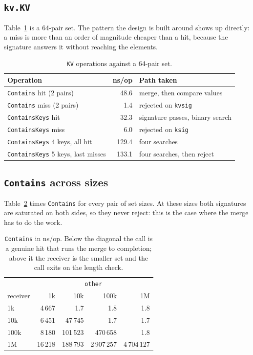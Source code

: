 \documentclass[11pt]{article}
\newcommand{\code}[1]{\texttt{#1}}
\begin{document}
\subsection{\code{kv.KV}}

Table~\ref{tab:kv} is a 64-pair set. The pattern the design is built around
shows up directly: a miss is more than an order of magnitude cheaper than a hit,
because the signature answers it without reaching the elements.

\begin{table}[h]
\centering
\begin{tabular}{lrl}
\hline
Operation & ns/op & Path taken \\
\hline
\code{Contains} hit (2 pairs)      &  48.6 & merge, then compare values \\
\code{Contains} miss (2 pairs)     &   1.4 & rejected on \code{kvsig} \\
\code{ContainsKeys} hit            &  32.3 & signature passes, binary search \\
\code{ContainsKeys} miss           &   6.0 & rejected on \code{ksig} \\
\code{ContainsKeys} 4 keys, all hit & 129.4 & four searches \\
\code{ContainsKeys} 5 keys, last misses & 133.1 & four searches, then reject \\
\hline
\end{tabular}
\caption{\code{KV} operations against a 64-pair set.}
\label{tab:kv}
\end{table}

\subsection{\code{Contains} across sizes}

Table~\ref{tab:pairwise} times \code{Contains} for every pair of set sizes. At
these sizes both signatures are saturated on both sides, so they never reject:
this is the case where the merge has to do the work.

\begin{table}[h]
\centering
\begin{tabular}{lrrrr}
\hline
 & \multicolumn{4}{c}{\code{other}} \\
receiver & 1k & 10k & 100k & 1M \\
\hline
1k   &      4\,667 &     1.7 &      1.8 &      1.8 \\
10k  &      6\,451 & 47\,745 &      1.7 &      1.7 \\
100k &      8\,180 & 101\,523 & 470\,658 &      1.8 \\
1M   &     16\,218 & 188\,793 & 2\,907\,257 & 4\,704\,127 \\
\hline
\end{tabular}
\caption{\code{Contains} in ns/op. Below the diagonal the call is a genuine hit
that runs the merge to completion; above it the receiver is the smaller set and
the call exits on the length check.}
\label{tab:pairwise}
\end{table}
\end{document}
